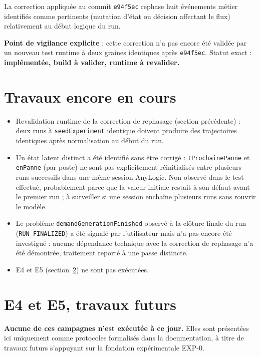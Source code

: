 \documentclass[11pt,a4paper]{article}
\newcommand{\code}[1]{\texttt{#1}}
\begin{document}
La correction appliquée au commit \code{e94f5ec} rephase huit événements
métier identifiés comme pertinents (mutation d'état ou décision affectant
le flux) relativement au début logique du run.

\textbf{Point de vigilance explicite} : cette correction n'a pas encore été
validée par un nouveau test runtime à deux graines identiques après
\code{e94f5ec}. Statut exact : \textbf{implémentée, build à valider,
runtime à revalider.}

\section{Travaux encore en cours}

\begin{itemize}
  \item Revalidation runtime de la correction de rephasage
        (section précédente) : deux runs à \code{seedExperiment} identique
        doivent produire des trajectoires identiques après normalisation
        au début du run.
  \item Un état latent distinct a été identifié sans être corrigé :
        \code{tProchainePanne} et \code{enPanne} (par poste) ne sont pas
        explicitement réinitialisés entre plusieurs runs successifs dans
        une même session AnyLogic. Non observé dans le test effectué,
        probablement parce que la valeur initiale restait à son défaut
        avant le premier run ; à surveiller si une session enchaîne
        plusieurs runs sans rouvrir le modèle.
  \item Le problème \code{demandGenerationFinished} observé à la clôture
        finale du run (\code{RUN\_FINALIZED}) a été signalé par
        l'utilisateur mais n'a pas encore été investigué : aucune
        dépendance technique avec la correction de rephasage n'a été
        démontrée, traitement reporté à une passe distincte.
  \item E4 et E5 (section~\ref{sec:e4e5}) ne sont pas exécutées.
\end{itemize}

\section{E4 et E5, travaux futurs}
\label{sec:e4e5}

\textbf{Aucune de ces campagnes n'est exécutée à ce jour.} Elles sont
présentées ici uniquement comme protocoles formalisés dans la
documentation, à titre de travaux futurs s'appuyant sur la fondation
expérimentale EXP-0.
\end{document}
